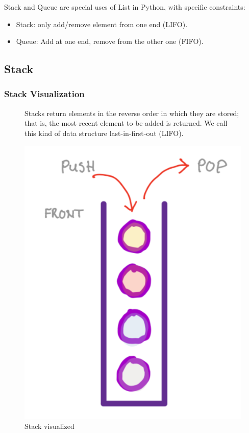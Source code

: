 \begin{tcolorbox}[title=Stack and Queue definition,coltitle =black,fonttitle=\large\bfseries,colback=green!5!white,colframe=green!75!black]
	Stack and Queue are special uses of List in Python, with specific constraints:
	\begin{itemize}
		\item Stack: only add/remove element from one end (LIFO).
		\item Queue: Add at one end, remove from the other one (FIFO).
	\end{itemize}
\end{tcolorbox}

\subsection{Stack}
\subsubsection{Stack Visualization}
\begin{figure}[h]
	\centering 
	\begin{minipage}[b]{0.45\textwidth}
		\raggedright
		Stacks return elements in the reverse order in which they are stored; that is, the most recent element to be added is returned. We call this kind of data structure last-in-first-out (LIFO).
	\end{minipage}
	\hfill
	\begin{minipage}[c]{0.3\textwidth}
		\centering
		\includegraphics[width=\linewidth]{figures/stack-animation}
		\caption{Stack visualized}
	\end{minipage}
\end{figure}

